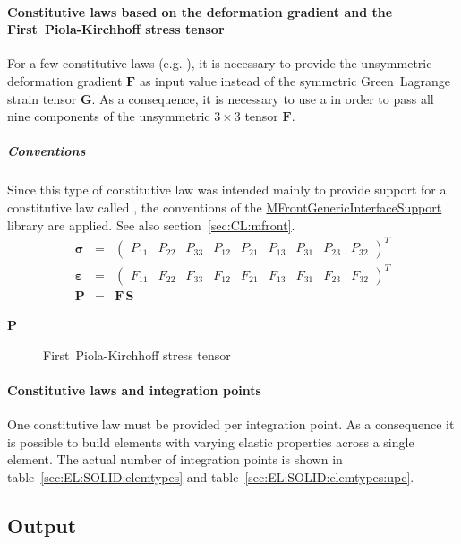 \paragraph{Constitutive laws based on the deformation gradient and the First~Piola-Kirchhoff stress tensor}
\label{sec:EL:SOLID:constlaw:F}
For a few constitutive laws (e.g. ), it is necessary to provide
the unsymmetric deformation gradient $\boldsymbol{F}$ as input value instead of the symmetric
Green~Lagrange strain tensor $\boldsymbol{G}$.
As a consequence, it is necessary to use a  in order to pass all nine components of the unsymmetric $3 \times 3$ tensor $\boldsymbol{F}$.
\subparagraph{Conventions}
Since this type of constitutive law was intended mainly to provide support for a constitutive law called ,
the conventions of the \href{https://thelfer.github.io/mgis/web/index.html}{MFrontGenericInterfaceSupport} library are applied\cite{helfer_introducing_2015}. See also section~\ref{sec:CL:mfront}.
\begin{eqnarray}
  \boldsymbol{\sigma} & = & \begin{pmatrix} P_{11} & P_{22} & P_{33} & P_{12} & P_{21} & P_{13} & P_{31} & P_{23} & P_{32} \end{pmatrix}^T \\
  \boldsymbol{\varepsilon} & = & \begin{pmatrix} F_{11} & F_{22} & F_{33} & F_{12} & F_{21} & F_{13} & F_{31} & F_{23} & F_{32} \end{pmatrix}^T \\
  \boldsymbol{P} & = & \boldsymbol{F} \, \boldsymbol{S}
\end{eqnarray}
\begin{description}
\item[$\boldsymbol{P}$] First~Piola-Kirchhoff stress tensor
\end{description}

\paragraph{Constitutive laws and integration points}
One constitutive law must be provided per integration point.
As a consequence it is possible to build elements with varying elastic properties across a single element.
The actual number of integration points is shown in table~\ref{sec:EL:SOLID:elemtypes} and table~\ref{sec:EL:SOLID:elemtypes:upc}.
\subsection{Output}
